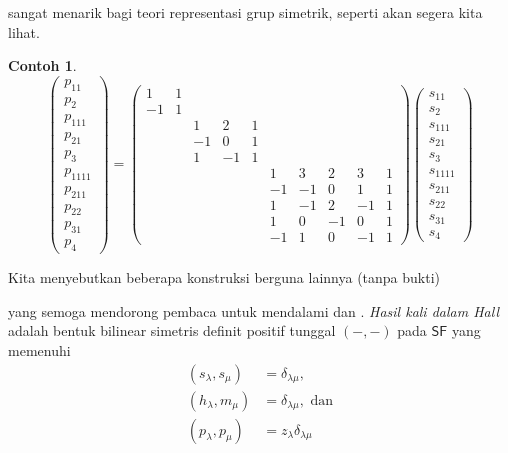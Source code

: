 \documentclass[12pt]{article}
\theoremstyle{plain}
\theoremstyle{definition}
\newtheorem{example}[theorem]{Contoh}
\theoremstyle{remark}
\numberwithin{equation}{section}
\begin{document}
sangat menarik bagi teori representasi grup simetrik,
seperti akan segera kita lihat.
\begin{example} \label{ex:transSP}
\[
\begin{pmatrix}
p_{11}\\ p_2\\ p_{111}\\ p_{21}\\ p_3\\
p_{1111}\\ p_{211} \\ p_{22}\\ p_{31}\\ p_4
\end{pmatrix}
=
\begin{pmatrix}
1 & 1 &
 & & &
& & & & \\
-1 & 1 &
 & & &
& & & & \\
 & &
1 & 2 & 1 &
& & & & \\
 & &
-1 & 0 & 1 &
& & & & \\
 & &
1 & -1 & 1 &
& & & & \\
 & &
 & & &
1 & 3 & 2 & 3 & 1 \\
 & &
 & & &
-1 & -1 & 0 & 1 & 1 \\
 & &
 & & &
1 & -1 & 2 & -1 & 1 \\
 & &
 & & &
1 & 0 & -1 & 0 & 1 \\
 & &
 & & &
-1 & 1 & 0 & -1 & 1
\end{pmatrix} 
\begin{pmatrix} s_{11}\\ s_2\\ s_{111}\\ s_{21}\\ s_3\\
s_{1111}\\ s_{211} \\ s_{22}\\ s_{31}\\ s_4
\end{pmatrix}
\]


\end{example}
Kita menyebutkan beberapa konstruksi berguna lainnya (tanpa bukti)

yang semoga mendorong pembaca untuk
mendalami \cite{Macdonald} dan \cite{Stanley2}.
\emph{Hasil kali dalam Hall} adalah bentuk bilinear simetris
definit positif tunggal $(-,-)$ pada $\mathsf{SF}$ yang memenuhi
\begin{align*}
( s_\lambda, s_\mu ) &= \delta_{\lambda \mu},\\
( h_\lambda, m_\mu ) &= \delta_{\lambda \mu}, \textrm{ dan}\\
( p_\lambda, p_\mu ) &= z_\lambda \delta_{\lambda \mu}
\end{align*}
\end{document}
